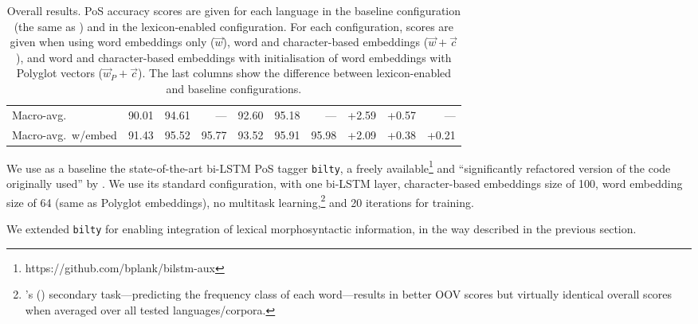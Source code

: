 \documentclass[11pt,a4paper]{article}
\newcommand\hm[1]{\textcolor{blue}{#1}}
\newcommand\bs[1]{\textcolor{red}{#1}}
\newcommand\discussion[1]{}
\begin{document}
\begin{table}[t]
\begin{tabular}{l|rrr|rrr|rrr}
\midrule
Macro-avg. & 90.01 & 94.61 & --- & 92.60 & 95.18 & --- & +2.59 & +0.57 & ---\\
Macro-avg.~w/embed & 91.43 & 95.52 & 95.77 & 93.52 & 95.91 & 95.98 & +2.09 & +0.38 & +0.21\\
\end{tabular}
\caption{Overall results. PoS accuracy scores are given for each language in the baseline
  configuration (the same as \citealp{plank16}) and in the lexicon-enabled configuration. For each configuration, scores
are given when using word embeddings only ($\vec{w}$), word and character-based embeddings ($\vec{w}+\vec{c}$), and word
and character-based embeddings with initialisation of word embeddings with Polyglot vectors ($\vec{w}_P+\vec{c}$). The
 last columns show the difference between lexicon-enabled and baseline configurations.{}}\label{tbl:results}
\end{table}

\discussion{\hm{\textbf{HM What about "We use the bi-LSTM system described in Section 2"?}}\bs{\textbf{We don't need to
      reduce that much in fact. So I suggest we keep this paragraph as is}}} We use as a baseline the state-of-the-art
bi-LSTM PoS tagger \texttt{bilty}, a freely available\footnote{https://github.com/bplank/bilstm-aux} and ``significantly
refactored version of the code originally used'' by \citet{plank16}. We use its standard configuration, with one bi-LSTM
layer, character-based embeddings size of 100, word embedding size of 64 (same as Polyglot embeddings), no multitask
learning,\footnote{\citeauthor{plank16}'s (\citeyear{plank16}) secondary task---predicting the frequency class of each
  word---results in better OOV scores but virtually identical overall scores when averaged over all tested
  languages/corpora.} and 20 iterations for training.

We extended \texttt{bilty} for enabling integration of lexical morphosyntactic information, in the way described in the
previous section.%
\end{document}
